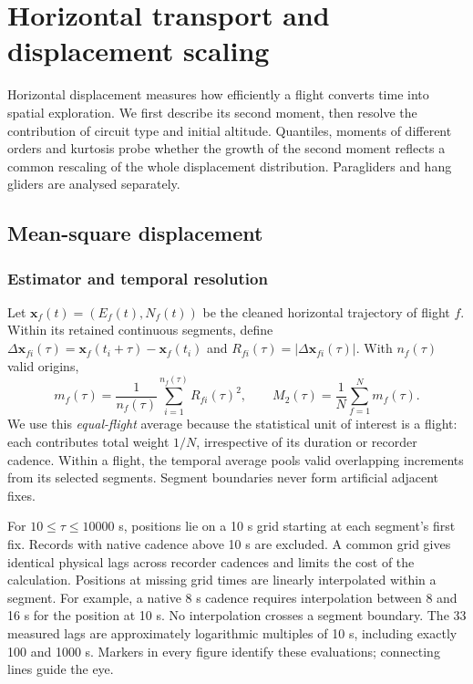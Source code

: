 \chapter{Horizontal transport and displacement scaling}
\label{ch:fixed-transport}


Horizontal displacement measures how efficiently a flight converts time into spatial
exploration. We first describe its second moment, then resolve the contribution of
circuit type and initial altitude. Quantiles, moments of different orders and kurtosis
probe whether the growth of the second moment reflects a common rescaling of the
whole displacement distribution. Paragliders and hang gliders are analysed separately.

\section{Mean-square displacement}
\label{sec:fixed-msd}
\subsection{Estimator and temporal resolution}

Let $\boldsymbol{x}_f(t)=(E_f(t),N_f(t))$ be the cleaned horizontal trajectory of flight
$f$. Within its retained continuous segments, define
$\Delta\boldsymbol{x}_{fi}(\tau)=\boldsymbol{x}_f(t_i+\tau)-\boldsymbol{x}_f(t_i)$
and $R_{fi}(\tau)=|\Delta\boldsymbol{x}_{fi}(\tau)|$. With $n_f(\tau)$ valid origins,
\begin{equation}
 m_f(\tau)=\frac{1}{n_f(\tau)}\sum_{i=1}^{n_f(\tau)}R_{fi}(\tau)^2,
 \qquad M_2(\tau)=\frac{1}{N}\sum_{f=1}^{N}m_f(\tau).
 \label{eq:fixed-msd}
\end{equation}
We use this \emph{equal-flight} average because the statistical unit of interest is a
flight: each contributes total weight $1/N$, irrespective of its duration or recorder
cadence. Within a flight, the temporal average pools valid overlapping increments
from its selected segments. Segment boundaries never form artificial adjacent fixes.

For $10\leq\tau\leq10000$ s, positions lie on a 10 s grid starting at each segment's
first fix. Records with native cadence above 10 s are excluded. A common grid gives
identical physical lags across recorder cadences and limits the cost of the calculation.
Positions at missing grid times are linearly interpolated within a segment. For example,
a native 8 s cadence requires interpolation between 8 and 16 s for the position at
10 s. No interpolation crosses a segment boundary. The 33 measured lags are approximately
logarithmic multiples of 10 s, including exactly 100 and 1000 s. Markers in every figure
identify these evaluations; connecting lines guide the eye.

